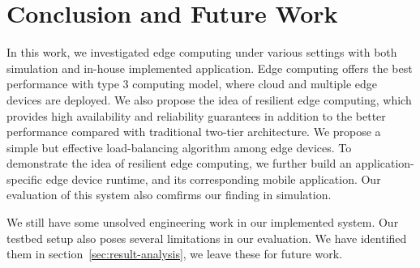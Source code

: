 \section{Conclusion and Future Work}
\label{sec:conclusion}

In this work, we investigated edge computing under various settings
with both simulation and in-house implemented application.
Edge computing offers the best performance with type 3 computing model,
where cloud and multiple edge devices are deployed.
We also propose the idea of resilient edge computing, which provides high
availability and reliability guarantees in addition to the better performance
compared with traditional two-tier architecture. We propose a simple but
effective load-balancing algorithm among edge devices.
To demonstrate the idea of resilient edge computing, we further build an application-specific
edge device runtime, and its corresponding mobile application. Our evaluation of this system
also comfirms our finding in simulation.

We still have some unsolved engineering work in our implemented system. Our testbed
setup also poses several limitations in our evaluation. We have identified them in
section~\ref{sec:result-analysis}, we leave these for future work.
